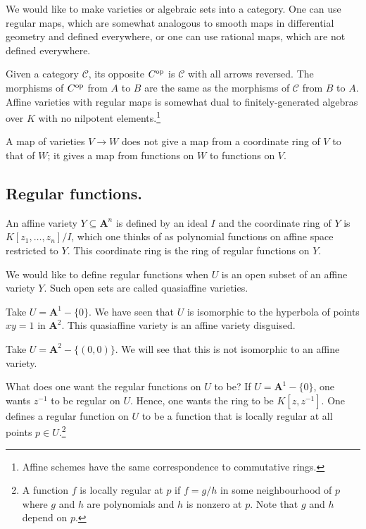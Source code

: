 \documentclass [11 pt, oneside] {article}
\begin{document}
We would like to make varieties or algebraic sets into a category. One can use regular maps, which are somewhat analogous to smooth maps in differential geometry and defined everywhere, or one can use rational maps, which are not defined everywhere.

Given a category $\mathscr{C} $, its opposite $\relax{C}^{\textup {op}}$ is $\mathscr{C} $ with all arrows reversed. The morphisms of ${\relax{C}}^{\textup {op}} $ from $A$ to $B$ are the same as the morphisms of $\mathscr{C} $ from $B$ to $A$. Affine varieties with regular maps is somewhat dual to finitely-generated algebras over $K$ with no nilpotent elements.\footnote{Affine schemes have the same correspondence to commutative rings.}

A map of varieties $V\longrightarrow W$ does not give a map from a coordinate ring of $V$ to that of $W$; it gives a map from functions on $W$ to functions on $V$.


\subsection{Regular functions.}
An affine variety $Y\subseteq \mathbf{A}^n$ is defined by an ideal $I$ and the coordinate ring of $Y$ is $K[z_1,\hdots,z_n]/I$, which one thinks of as polynomial functions on affine space restricted to $Y$. This coordinate ring is the ring of regular functions on $Y$.

We would like to define regular functions when $U$ is an open subset of an affine variety $Y$. Such open sets are called quasiaffine varieties.

\begin{example}\label{}
Take $U=\mathbf{A}^1-\{0\}$. We have seen that $U$ is isomorphic to the hyperbola of points $xy=1$ in $\mathbf{A}^2$. This quasiaffine variety is an affine variety disguised.

Take $U=\mathbf{A}^2-\{(0,0)\}$. We will see that this is not isomorphic to an affine variety.
\end{example}

What does one want the regular functions on $U$ to be? If $U=\mathbf{A}^1-\{0\}$, one wants $z^{-1}$ to be regular on $U$. Hence, one wants the ring to be $K[z,z^{-1}]$. One defines a regular function on $U$ to be a function that is locally regular at all points $p\in U$.\footnote{A function $f$ is locally regular at $p$ if $f=g/h$ in some neighbourhood of $p$ where $g$ and $h$ are polynomials and $h$ is nonzero at $p$. Note that $g$ and $h$ depend on $p$.}
\end{document}
